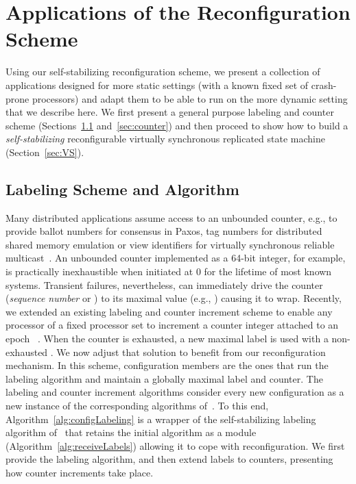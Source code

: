 \documentclass[11pt]{article}
\begin{document}
\section{Applications of the Reconfiguration Scheme}
\label{sec:labelCounter}
Using our self-stabilizing reconfiguration scheme, we present a collection of applications designed for more static settings (with a known fixed set of crash-prone processors) and adapt them to be able to run on the more dynamic setting that we describe here.
We first present a general purpose labeling and counter scheme (Sections~\ref{sec:label} and~\ref{sec:counter}) and then proceed to show how to build a  \emph{self-stabilizing} reconfigurable virtually synchronous replicated state machine (Section~\ref{sec:VS}). 





\subsection{Labeling Scheme and Algorithm}
\label{sec:label}
Many distributed applications assume access to an unbounded counter, e.g., to provide ballot numbers for consensus in Paxos, tag numbers for distributed shared memory emulation or view identifiers for virtually synchronous reliable multicast~\cite{SSVS}.
An unbounded counter implemented as a 64-bit integer, for example, is practically inexhaustible when initiated at 0 for the lifetime of most known systems.
Transient failures, nevertheless, can immediately drive the counter (\emph{sequence number} or ) to its maximal value (e.g., ) causing it to wrap. 
Recently, we extended an existing labeling and counter increment scheme to enable any processor of a fixed processor set to increment a counter integer attached to an epoch ~\cite{SSVS}.
When the counter is exhausted, a new maximal label is used with a non-exhausted . 
We now adjust that solution to benefit from our reconfiguration mechanism. 
In this scheme, configuration members are the ones that run the labeling algorithm and maintain a globally maximal label and counter.
The labeling and counter increment algorithms consider every new configuration as a new instance of the corresponding algorithms of~\cite{SSVS}.
To this end, Algorithm~\ref{alg:configLabeling} is a wrapper of the self-stabilizing labeling algorithm of~\cite{SSVS} that retains the initial algorithm as a module (Algorithm~\ref{alg:receiveLabels}) allowing it to cope with reconfiguration. 
We first provide the labeling algorithm, and then extend labels to counters, presenting how counter increments take place.
\end{document}
